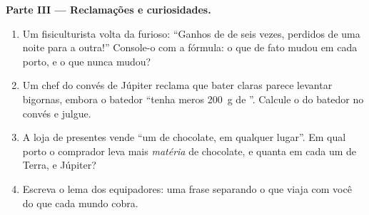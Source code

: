 \begin{problem}
\medskip\noindent\textbf{Parte III --- Reclamações e curiosidades.}
\begin{enumerate}[resume]
  \item Um fisiculturista volta da  furioso: ``Ganhos de  de
        seis vezes, perdidos de uma noite para a outra!'' Console-o
        com a fórmula: o que de fato mudou em cada porto, e o que
        nunca mudou?
  \item Um chef do convés de Júpiter reclama que bater claras parece
        levantar bigornas, embora o batedor ``tenha meros \qty{200}{g}
        de ''. Calcule o  do batedor no convés e julgue.
  \item A loja de presentes vende ``um  de chocolate, em
        qualquer lugar''. Em qual porto o comprador leva mais
        \emph{matéria} de chocolate, e quanta  em cada um de
        Terra,  e Júpiter?
  \item Escreva o lema dos equipadores: uma frase separando o que
        viaja com você do que cada mundo cobra.
\end{enumerate}
\end{problem}
